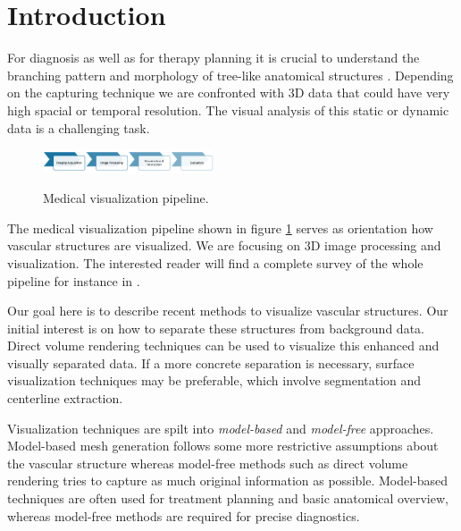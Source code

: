 \section{Introduction}


For diagnosis as well as for therapy planning it is crucial to understand the branching pattern and morphology of tree-like anatomical structures \cite{preim2013visual}.
Depending on the capturing technique we are confronted with 3D data that could have very high spacial or temporal resolution. The visual analysis of this static or dynamic data is a challenging task.

\begin{figure}[h]
	\centering
	\includegraphics[width=0.45\textwidth]{./Images/MedicalVisualizationPipeline.png} \\
	\caption{Medical visualization pipeline.}
	\label{fig:MedicalVisualizationPipeline}
\end{figure}

The medical visualization pipeline shown in figure \ref{fig:MedicalVisualizationPipeline} serves as orientation how vascular structures are visualized. We are focusing on 3D image processing and visualization. The interested reader will find a complete survey of the whole pipeline for instance in \cite{preim2013visual}. 

Our goal here is to describe recent methods to visualize vascular structures. Our initial interest is on how to separate these structures from background data. Direct volume rendering techniques can be used to visualize this enhanced and visually separated data. If a more concrete separation is necessary, surface visualization techniques may be preferable, which involve segmentation and centerline extraction. 

Visualization techniques are spilt into \emph{model-based} and \emph{model-free} approaches. 
Model-based mesh generation follows some more restrictive assumptions about the vascular structure whereas model-free methods such as direct volume rendering tries to capture as much original information as possible. Model-based techniques are often used for treatment planning and basic anatomical overview, whereas model-free methods are required for precise diagnostics.


